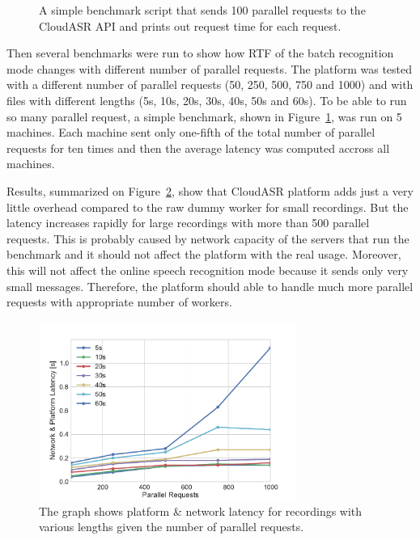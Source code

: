 \begin{figure}[h]
  

  \caption{A simple benchmark script that sends 100 parallel requests to the CloudASR API and prints out request time for each request.}
  \label{fig:benchmark}
\end{figure}

Then several benchmarks were run to show how RTF of the batch recognition mode changes with different number of parallel requests.
The platform was tested with a different number of parallel requests (50, 250, 500, 750 and 1000)
  and with files with different lengths (5s, 10s, 20s, 30s, 40s, 50s and 60s).
To be able to run so many parallel request,
  a simple benchmark, shown in Figure~\ref{fig:benchmark}, was run on 5 machines.
Each machine sent only one-fifth of the total number of parallel requests for ten times
  and then the average latency was computed accross all machines.

Results, summarized on Figure~\ref{fig:parallel-benchmark}, show
  that CloudASR platform adds just a very little overhead compared to the raw dummy worker for small recordings.
But the latency increases rapidly for large recordings with more than 500 parallel requests.
This is probably caused by network capacity of the servers that run the benchmark
  and it should not affect the platform with the real usage.
Moreover, this will not affect the online speech recognition mode because it sends only very small messages.
Therefore, the platform should able to handle much more parallel requests with appropriate number of workers.

\begin{figure}
  \centering
  \includegraphics[width=0.75\textwidth]{./img/parallel.pdf}

  \caption{
    The graph shows platform \& network latency for recordings with various lengths
      given the number of parallel requests.
  }
  \label{fig:parallel-benchmark}
\end{figure}
